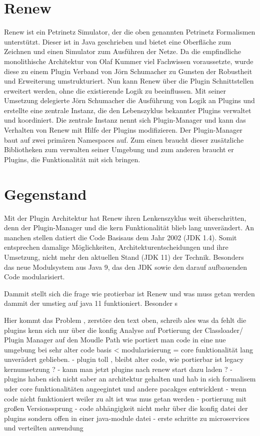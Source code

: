 \section{Renew} 
Renew ist ein Petrinetz Simulator, der die oben genannten Petrinetz Formalismen unterstützt. Dieser ist in Java geschrieben und bietet eine Oberfläche zum Zeichnen und einen Simulator zum Ausführen der Netze. \newline 
Da die empfindliche monolithische Architektur von Olaf Kummer viel Fachwissen voraussetzte, wurde diese zu einem Plugin Verband von Jörn Schumacher zu Gunsten der Robustheit und Erweiterung umstrukturiert. Nun kann Renew über die Plugin Schnittstellen erweitert werden, ohne die existierende Logik zu beeinflussen. \bigbreak
Mit seiner Umsetzung delegierte Jörn Schumacher die Ausführung von Logik an Plugins und erstellte eine zentrale Instanz, die den Lebenszyklus bekannter Plugins verwaltet und koordiniert. Die zentrale Instanz nennt sich Plugin-Manager und kann das Verhalten von Renew mit Hilfe der Plugins modifizieren.
Der Plugin-Manager baut auf zwei primären Namespaces auf. Zum einen braucht dieser zusätzliche Bibliotheken zum verwalten seiner Umgebung und zum anderen braucht er Plugins, die Funktionalität mit sich bringen. 
\bigbreak 

\section{Gegenstand}
Mit der Plugin Architektur hat Renew ihren Lenkenszyklus weit überschritten, denn der Plugin-Manager und die kern Funktionalität blieb lang unverändert. An manchen stellen datiert die Code Basisaus dem  Jahr 2002 (JDK 1.4). 
Somit entsprechen damalige Möglichkeiten, Architekturentscheidungen und ihre Umsetzung, nicht mehr den aktuellen Stand (JDK 11) der Technik. Besonders das neue Modulsystem aus Java 9, das den JDK sowie den darauf aufbauenden Code modularisiert.  


Dammit stellt sich die frage wie protierbar ist Renew und was muss getan werden dammit der umstieg auf java 11 funktioniert. 
Besonder s



Hier kommt das Problem , zerstöre den text oben, schreib ales was da fehlt 
die plugins kenn sich  nur über die konfig 
Analyse auf Portierung der Classloader/ Plugin Manager auf den Moudle Path 
wie portiert man code in eine nue umgebung bei sehr alter code basis < modularisierung = core funktionalität lang unverädert geblieben.
- plugin toll , bleibt alter code, wie portierbar ist legacy  kernumsetzung ?
- kann man jetzt plugins nach renew start  dazu laden ?
- plugins haben sich nicht saber an  architektur gehalten und hab in sich formalisem uder core funktionalitäten angeegintet  und andere pacakges entwicklent 
- wenn code nicht funktioniert weiler zu alt ist was mus getan werden 
- portierung  mit großen Versionssprung 
- code abhängigkeit nicht mehr über die konfig datei der plugins sondern offen in einer java-module datei
- erste schritte zu microservices und verteilten anwendung 

